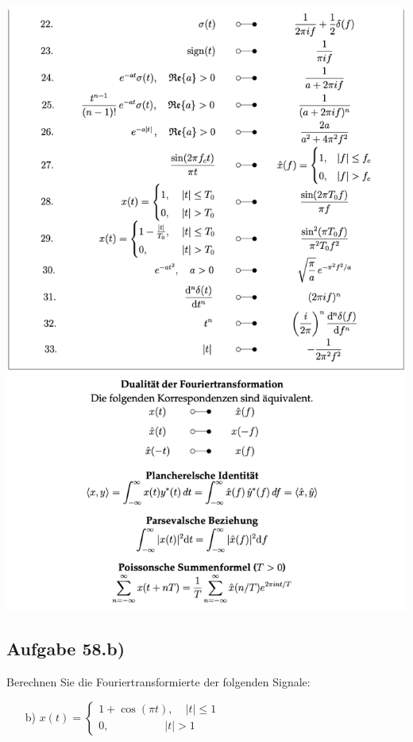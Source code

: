 \documentclass[11pt]{article}
\begin{document}
\begin{center}
    \includegraphics[width=0.85\linewidth]{docimgs/fs2.png}
\end{center}

\pagebreak

\subsection*{Aufgabe 58.b)}
\vspace*{-0.5cm}
Berechnen Sie die Fouriertransformierte der folgenden Signale:
\vspace*{-0.5cm}
\begin{itemize}
    \item[b)] $x(t) = \begin{cases}
        1 + \cos(\pi t), \hspace{13pt} |t| \leq 1\\
        0, \hspace{60pt} |t| > 1
    \end{cases}$
\end{itemize}
\end{document}
